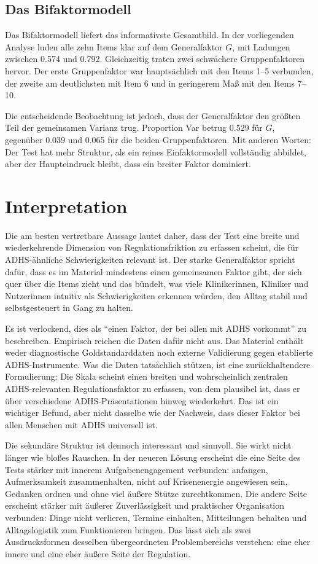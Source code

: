 \documentclass[11pt,a4paper]{article}
\begin{document}
\subsection{Das Bifaktormodell}
Das Bifaktormodell liefert das informativste Gesamtbild. In der vorliegenden Analyse luden alle zehn Items klar auf dem Generalfaktor $G$, mit Ladungen zwischen 0.574 und 0.792. Gleichzeitig traten zwei schwächere Gruppenfaktoren hervor. Der erste Gruppenfaktor war hauptsächlich mit den Items 1--5 verbunden, der zweite am deutlichsten mit Item 6 und in geringerem Maß mit den Items 7--10.

Die entscheidende Beobachtung ist jedoch, dass der Generalfaktor den größten Teil der gemeinsamen Varianz trug. Proportion Var betrug 0.529 für $G$, gegenüber 0.039 und 0.065 für die beiden Gruppenfaktoren. Mit anderen Worten: Der Test hat mehr Struktur, als ein reines Einfaktormodell vollständig abbildet, aber der Haupteindruck bleibt, dass ein breiter Faktor dominiert.

\section{Interpretation}
Die am besten vertretbare Aussage lautet daher, dass der Test eine breite und wiederkehrende Dimension von Regulationsfriktion zu erfassen scheint, die für ADHS-ähnliche Schwierigkeiten relevant ist. Der starke Generalfaktor spricht dafür, dass es im Material mindestens einen gemeinsamen Faktor gibt, der sich quer über die Items zieht und das bündelt, was viele Klinikerinnen, Kliniker und Nutzerinnen intuitiv als Schwierigkeiten erkennen würden, den Alltag stabil und selbstgesteuert in Gang zu halten.

Es ist verlockend, dies als ``einen Faktor, der bei allen mit ADHS vorkommt'' zu beschreiben. Empirisch reichen die Daten dafür nicht aus. Das Material enthält weder diagnostische Goldstandarddaten noch externe Validierung gegen etablierte ADHS-Instrumente. Was die Daten tatsächlich stützen, ist eine zurückhaltendere Formulierung: Die Skala scheint einen breiten und wahrscheinlich zentralen ADHS-relevanten Regulationsfaktor zu erfassen, von dem plausibel ist, dass er über verschiedene ADHS-Präsentationen hinweg wiederkehrt. Das ist ein wichtiger Befund, aber nicht dasselbe wie der Nachweis, dass dieser Faktor bei allen Menschen mit ADHS universell ist.

Die sekundäre Struktur ist dennoch interessant und sinnvoll. Sie wirkt nicht länger wie bloßes Rauschen. In der neueren Lösung erscheint die eine Seite des Tests stärker mit innerem Aufgabenengagement verbunden: anfangen, Aufmerksamkeit zusammenhalten, nicht auf Krisenenergie angewiesen sein, Gedanken ordnen und ohne viel äußere Stütze zurechtkommen. Die andere Seite erscheint stärker mit äußerer Zuverlässigkeit und praktischer Organisation verbunden: Dinge nicht verlieren, Termine einhalten, Mitteilungen behalten und Alltagslogistik zum Funktionieren bringen. Das lässt sich als zwei Ausdrucksformen desselben übergeordneten Problembereichs verstehen: eine eher innere und eine eher äußere Seite der Regulation.
\end{document}
